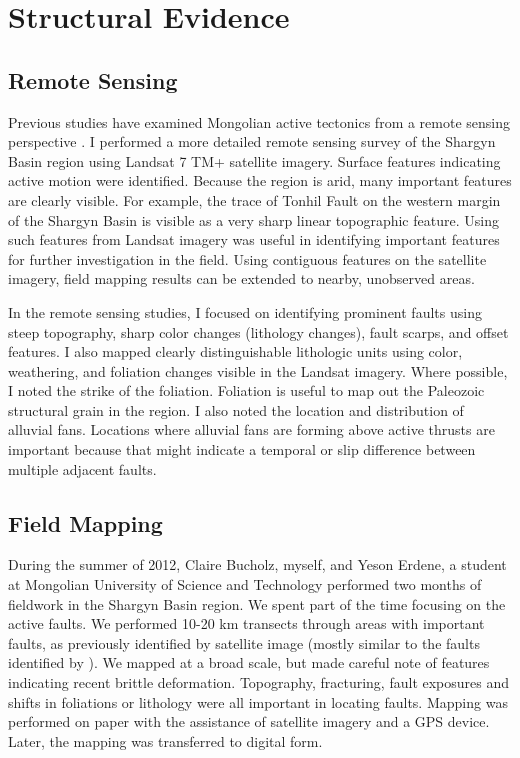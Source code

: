 \section{Structural Evidence}
\subsection{Remote Sensing}
Previous studies have examined Mongolian active tectonics from a remote sensing perspective \citep{Cunningham2005a}\citep{Cunningham2010}\citep{Tapponnier1979}\citep{Walker2007}. I performed a more detailed remote sensing survey of the Shargyn Basin region using Landsat 7 TM+ satellite imagery. Surface features indicating active motion were identified. Because the region is arid, many important features are clearly visible. For example, the trace of Tonhil Fault on the western margin of the Shargyn Basin is visible as a very sharp linear topographic feature. Using such features from Landsat imagery was useful in identifying important features for further investigation in the field. Using contiguous features on the satellite imagery, field mapping results can be extended to nearby, unobserved areas.

In the remote sensing studies, I focused on identifying prominent faults using steep topography, sharp color changes (lithology changes), fault scarps, and offset features. I also mapped clearly distinguishable lithologic units using color, weathering, and foliation changes visible in the Landsat imagery. Where possible, I noted the strike of the foliation. Foliation is useful to map out the Paleozoic structural grain in the region. I also noted the location and distribution of alluvial fans. Locations where alluvial fans are forming above active thrusts are important because that might indicate a temporal or slip difference between multiple adjacent faults.

\subsection{Field Mapping}
During the summer of 2012, Claire Bucholz, myself, and Yeson Erdene, a student at Mongolian University of Science and Technology performed two months of fieldwork in the Shargyn Basin region. We spent part of the time focusing on the active faults. We performed 10-20 km transects through areas with important faults, as previously identified by satellite image (mostly similar to the faults identified by \citep{Walker2007}). We mapped at a broad scale, but made careful note of features indicating recent brittle deformation. Topography, fracturing, fault exposures and shifts in foliations or lithology were all important in locating faults.  Mapping was performed on paper with the assistance of satellite imagery and a GPS device. Later, the mapping was transferred to digital form.

